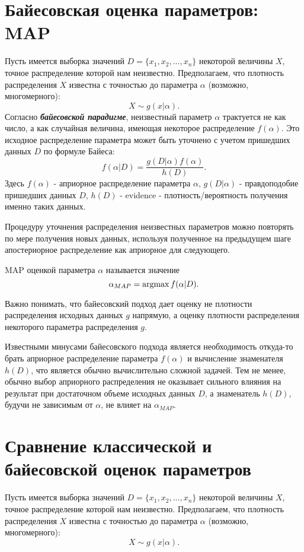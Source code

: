 \section{Байесовская оценка параметров: MAP}

Пусть имеется выборка значений $D = \{x_1, x_2, ..., x_n\}$ некоторой величины $X$, точное распределение которой нам неизвестно. Предполагаем, что плотность распределения $X$ известна с точностью до параметра $\alpha$ (возможно, многомерного): 
$$
X \sim g(x | \alpha).
$$
Согласно \textbf{\textit{байесовской парадигме}}, неизвестный параметр $\alpha$ трактуется не как число, а как случайная величина, имеющая некоторое распределение $f(\alpha)$. Это исходное распределение параметра может быть уточнено с учетом пришедших данных $D$ по формуле Байеса:
$$
f(\alpha | D) = \frac{g(D | \alpha)f(\alpha)}{h(D)}.
$$
Здесь $f(\alpha)$ - априорное распределение параметра $\alpha$, $g(D | \alpha)$ - правдоподобие пришедших данных $D$, 
$h(D)$ - evidence - плотность/вероятность получения именно таких данных.

Процедуру уточнения распределения неизвестных параметров можно повторять по мере получения новых данных, используя полученное на предыдущем шаге апостериорное распределение как априорное для следующего.

MAP оценкой параметра $\alpha$ называется значение
$$
\alpha_{MAP} = \operatorname*{argmax} f(\alpha | D).
$$

Важно понимать, что байесовский подход дает оценку не плотности распределения исходных данных $g$ напрямую, а оценку плотности распределения некоторого параметра распределения $g$.

Известными минусами байесовского подхода является необходимость откуда-то брать априорное распределение параметра $f(\alpha)$ и вычисление знаменателя $h(D)$, что является обычно вычислительно сложной задачей. Тем не менее, обычно выбор априорного распределения не оказывает сильного влияния на результат при достаточном объеме исходных данных $D$, а знаменатель $h(D)$, будучи не зависимым от $\alpha$, не влияет на $\alpha_{MAP}$.


\section{Сравнение классической и байесовской оценок параметров}

Пусть имеется выборка значений $D = \{x_1, x_2, ..., x_n\}$ некоторой величины $X$, точное распределение которой нам неизвестно. Предполагаем, что плотность распределения $X$ известна с точностью до параметра $\alpha$ (возможно, многомерного): 
$$
X \sim g(x | \alpha).
$$

